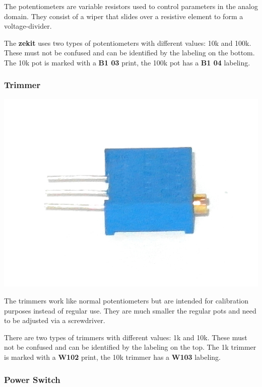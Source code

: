 \documentclass{scrartcl}
\begin{document}
The potentiometers are variable resistors used to control parameters in the analog domain. They consist of a wiper that slides over a resistive element to form a voltage-divider.

The \textbf{zekit} uses two types of potentiometers with different values: 10k and 100k. These must not be confused and can be identified by the labeling on the bottom. The 10k pot is marked with a \textbf{B1 03} print, the 100k pot has a \textbf{B1 04} labeling.

\subsubsection{Trimmer}

\begin{center}
    \includegraphics[scale=0.20]{assets/zekit-trimmer.jpg}
\end{center}

The trimmers work like normal potentiometers but are intended for calibration purposes instead of regular use. They are much smaller the regular pots and need to be adjusted via a screwdriver.

There are two types of trimmers with different values: 1k and 10k. These must not be confused and can be identified by the labeling on the top. The 1k trimmer is marked with a \textbf{W102} print, the 10k trimmer has a \textbf{W103} labeling.

\subsubsection{Power Switch}
\end{document}
